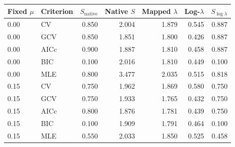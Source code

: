 \begin{tabular}{llrrrrr}
\toprule
Fixed $\mu$ & Criterion & $S_{\mathrm{native}}$ & Native $S$ & Mapped $\lambda$ & Log-$\lambda$ & $S_{\log\lambda}$ \\
\midrule
0.00 & CV & 0.850 & 2.004 & 1.879 & 0.545 & 0.887 \\
0.00 & GCV & 0.850 & 1.851 & 1.800 & 0.426 & 0.887 \\
0.00 & AICc & 0.900 & 1.887 & 1.810 & 0.458 & 0.887 \\
0.00 & BIC & 0.100 & 2.016 & 1.810 & 0.449 & 0.100 \\
0.00 & MLE & 0.800 & 3.477 & 2.035 & 0.515 & 0.818 \\
0.15 & CV & 0.750 & 1.962 & 1.869 & 0.580 & 0.750 \\
0.15 & GCV & 0.750 & 1.933 & 1.765 & 0.432 & 0.750 \\
0.15 & AICc & 0.800 & 1.876 & 1.781 & 0.439 & 0.750 \\
0.15 & BIC & 0.100 & 1.909 & 1.791 & 0.464 & 0.100 \\
0.15 & MLE & 0.550 & 2.033 & 1.850 & 0.525 & 0.458 \\
\bottomrule
\end{tabular}
